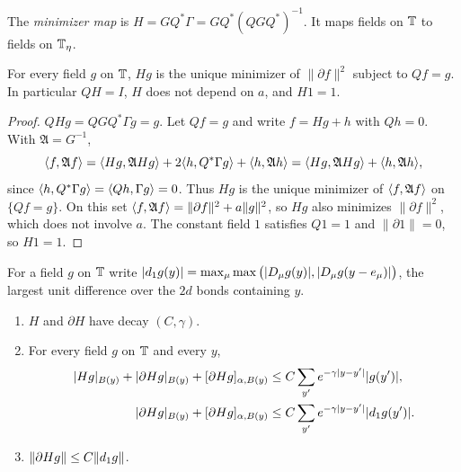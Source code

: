 \begin{definition}\label{x:8.2}
The \emph{minimizer map} is $H=GQ^*\Gamma=GQ^*(QGQ^*)^{-1}$. It maps fields on $\mathbb T$ to fields on $\mathbb T_\eta$.
\end{definition}

\begin{lemma}\label{lem:H-variational}
For every field $g$ on $\mathbb T$, $Hg$ is the unique minimizer of $\|\partial f\|^2$ subject to $Qf=g$. In particular $QH=I$, $H$ does not depend on $a$, and $H1=1$.
\end{lemma}

\begin{proof}
$QHg=QGQ^*\Gamma g=g$. Let $Qf=g$ and write $f=Hg+h$ with $Qh=0$. With $\mathfrak A=G^{-1}$,
\[
\langle f,\mathfrak Af\rangle=\langle Hg,\mathfrak AHg\rangle+2\langle h,Q^*\Gamma g\rangle+\langle h,\mathfrak Ah\rangle=\langle Hg,\mathfrak AHg\rangle+\langle h,\mathfrak Ah\rangle,
\]
since $\langle h,Q^*\Gamma g\rangle=\langle Qh,\Gamma g\rangle=0$. Thus $Hg$ is the unique minimizer of $\langle f,\mathfrak Af\rangle$ on $\{Qf=g\}$. On this set $\langle f,\mathfrak Af\rangle=\|\partial f\|^2+a\|g\|^2$, so $Hg$ also minimizes $\|\partial f\|^2$, which does not involve $a$. The constant field $1$ satisfies $Q1=1$ and $\|\partial1\|=0$, so $H1=1$.
\end{proof}

For a field $g$ on $\mathbb T$ write $|d_1 g(y)|=\max_\mu\max\big(|D_\mu g(y)|,|D_\mu g(y-e_\mu)|\big)$, the largest unit difference over the $2d$ bonds containing $y$.

\begin{theorem}\label{thm:H-scalar}
\begin{enumerate}[label=(\alph*)]
\item $H$ and $\partial H$ have decay $(C,\gamma)$.
\item For every field $g$ on $\mathbb T$ and every $y$,
\begin{align*}
|Hg|_{B(y)}+|\partial Hg|_{B(y)}+[\partial Hg]_{\alpha,B(y)}&\le C\sum_{y'}e^{-\gamma|y-y'|}|g(y')|,\\
|\partial Hg|_{B(y)}+[\partial Hg]_{\alpha,B(y)}&\le C\sum_{y'}e^{-\gamma|y-y'|}|d_1 g(y')| .
\end{align*}
\item $\|\partial Hg\|\le C\|d_1 g\|$.
\end{enumerate}
\end{theorem}


